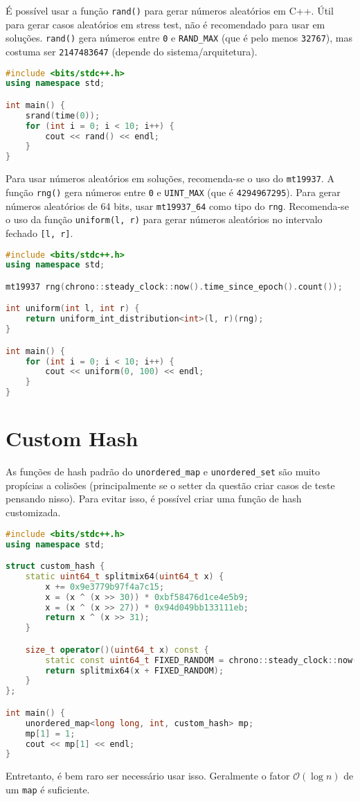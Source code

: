 É possível usar a função \texttt{rand()} para gerar números aleatórios em C++.
Útil para gerar casos aleatórios em stress test, não é recomendado para usar em soluções.
\texttt{rand()} gera números entre \texttt{0} e \texttt{RAND\_MAX} (que é pelo menos \texttt{32767}), mas costuma ser \texttt{2147483647} (depende do sistema/arquitetura).

\begin{lstlisting}[language=C++]
#include <bits/stdc++.h>
using namespace std;

int main() {
    srand(time(0));
    for (int i = 0; i < 10; i++) {
        cout << rand() << endl;
    }
}

\end{lstlisting}

Para usar números aleatórios em soluções, recomenda-se o uso do \texttt{mt19937}.
A função \texttt{rng()} gera números entre \texttt{0} e \texttt{UINT\_MAX} (que é \texttt{4294967295}).
Para gerar números aleatórios de 64 bits, usar \texttt{mt19937\_64} como tipo do \texttt{rng}.
Recomenda-se o uso da função \texttt{uniform(l, r)} para gerar números aleatórios no intervalo fechado \texttt{[l, r]}.

\begin{lstlisting}[language=C++]
#include <bits/stdc++.h>
using namespace std;

mt19937 rng(chrono::steady_clock::now().time_since_epoch().count());

int uniform(int l, int r) {
    return uniform_int_distribution<int>(l, r)(rng);
}

int main() {
    for (int i = 0; i < 10; i++) {
        cout << uniform(0, 100) << endl;
    }
}

\end{lstlisting}

\section{Custom Hash}

As funções de hash padrão do \texttt{unordered\_map} e \texttt{unordered\_set} são muito propícias a colisões (principalmente se o setter da questão criar casos de teste pensando nisso).
Para evitar isso, é possível criar uma função de hash customizada.

\begin{lstlisting}[language=C++]
#include <bits/stdc++.h>
using namespace std;

struct custom_hash {
    static uint64_t splitmix64(uint64_t x) {
        x += 0x9e3779b97f4a7c15;
        x = (x ^ (x >> 30)) * 0xbf58476d1ce4e5b9;
        x = (x ^ (x >> 27)) * 0x94d049bb133111eb;
        return x ^ (x >> 31);
    }

    size_t operator()(uint64_t x) const {
        static const uint64_t FIXED_RANDOM = chrono::steady_clock::now().time_since_epoch().count();
        return splitmix64(x + FIXED_RANDOM);
    }
};

int main() {
    unordered_map<long long, int, custom_hash> mp;
    mp[1] = 1;
    cout << mp[1] << endl;
}
\end{lstlisting}

Entretanto, é bem raro ser necessário usar isso. Geralmente o fator $\mathcal{O}(\log n)$ de um \texttt{map} é suficiente.